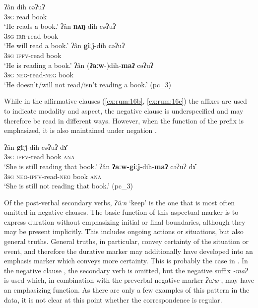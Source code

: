 \documentclass[output=paper,colorlinks,citecolor=brown]{langscibook}
\begin{document}
\ea\label{ex:rum:16}
    \ea\label{ex:rum:16a}
        \gll ʔân	dih	cəʔuʔ \\ 
             3\textsc{sg} read book \\
        \glt  ‘He reads a book.’
    \ex\label{ex:rum:16b}
        \gll ʔân	\textbf{nʌŋ}-dih	cəʔuʔ \\
             3\textsc{sg} \textsc{irr-}read book \\
        \glt ‘He will read a book.’
    \ex\label{ex:rum:16c}
        \gll ʔân	\textbf{giːj}-dih	cəʔuʔ \\
             3\textsc{sg} \textsc{ipfv-}read book \\
        \glt ‘He is reading a book.’
    \ex\label{ex:rum:16d}
        \gll ʔân	(\textbf{ʔaːw}-)dih-\textbf{maʔ}	cəʔuʔ \\
             3\textsc{sg} \textsc{neg-}read\textsc{{}-neg} book \\
        \glt ‘He doesn’t/will not read/isn’t reading a book.’ (pc\_3)
    \z
\z 

While in the affirmative clauses (\ref{ex:rum:16b}, \ref{ex:rum:16c}) the affixes are used to indicate modality and aspect, the negative clause  is underspecified and may therefore be read in different ways. However, when the function of the prefix is emphasized, it is also maintained under negation .

\ea\label{ex:rum:17}
    \ea\label{ex:rum:17a}
        \gll ʔân	\textbf{giːj}-dih	cəʔuʔ	dɤ̂ \\ 
             3\textsc{sg} \textsc{ipfv-}read book \textsc{ana} \\
        \glt ‘She is still reading that book.’
    \ex\label{ex:rum:17b}
        \gll ʔân	\textbf{ʔaːw-giːj}-dih-\textbf{maʔ}	cəʔuʔ	dɤ̂ \\
             3\textsc{sg} \textsc{neg-ipfv-}read\textsc{{}-neg} book \textsc{ana} \\
        \glt ‘She is still not reading that book.’ (pc\_3)
    \z
\z 

Of the post-verbal secondary verbs, \textit{ʔûːn} ‘keep’ is the one that is most often omitted in negative clauses. The basic function of this aspectual marker is to express duration without emphasizing initial or final boundaries, although they may be present implicitly. This includes ongoing actions or situations, but also general truths. General truths, in particular, convey certainty of the situation or event, and therefore the durative marker may additionally have developed into an emphasis marker which conveys more certainty. This is probably the case in . In the negative clause , the secondary verb is omitted, but the negative suffix \textit{{}-maʔ} is used which, in combination with the preverbal negative marker \textit{ʔaːw-}, may have an emphasizing function. As there are only a few examples of this pattern in the data, it is not clear at this point whether the correspondence is regular.
\end{document}
